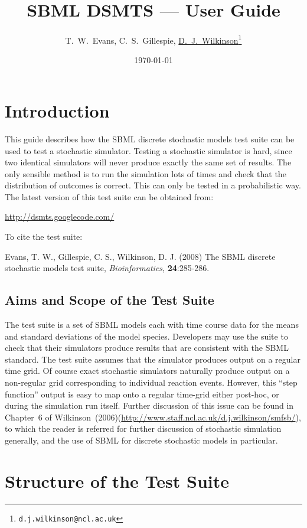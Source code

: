 \documentclass[12pt,a4paper]{article}
\title{SBML DSMTS --- User Guide}
\author{T.~W.~Evans, C.~S.~Gillespie,  \href{http://www.staff.ncl.ac.uk/d.j.wilkinson/}{D.~J.~Wilkinson}\thanks{\texttt{d.j.wilkinson@ncl.ac.uk}}}
\date{\today}
\begin{document}
\sf\maketitle

\section{Introduction} 

This guide describes how the SBML discrete stochastic models test
suite can be used to test a stochastic simulator. Testing a stochastic
simulator is hard, since two identical simulators will never produce
exactly the same set of results. The only sensible method is to run
the simulation lots of times and check that the distribution of
outcomes is correct. This can only be tested in a probabilistic way.
The latest version of this test suite can be obtained from:
\centerline{\url{http://dsmts.googlecode.com/}}

\noindent To cite the test suite:

\noindent
Evans, T. W., Gillespie, C. S., Wilkinson, D. J. (2008) The SBML discrete stochastic models test suite, \emph{Bioinformatics}, \textbf{24}:285-286.

\subsection{Aims and Scope of the Test Suite}

The test suite is a set of SBML models each with time course data for
the means and standard deviations of the model species. Developers may
use the suite to check that their simulators produce results that are
consistent with the SBML standard. The test suite assumes that the
simulator produces output on a regular time grid. Of course exact
stochastic simulators naturally produce output on a non-regular grid
corresponding to individual reaction events. However, this ``step
function'' output is easy to map onto a regular time-grid either
post-hoc, or during the simulation run itself. Further discussion of
this issue can be found in Chapter~6 of
Wilkinson~(2006)(\url{http://www.staff.ncl.ac.uk/d.j.wilkinson/smfsb/}),
to which the reader is referred for further discussion of stochastic
simulation generally, and the use of SBML for discrete stochastic
models in particular.

\section{Structure of the Test Suite}
\end{document}
